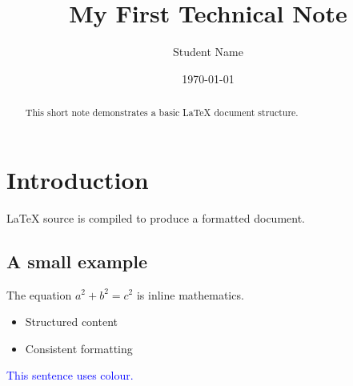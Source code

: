 \documentclass[12pt,a4paper]{article}
\title{My First Technical Note}
\author{Student Name}
\date{\today}
\begin{document}
\maketitle
\begin{abstract}
This short note demonstrates a basic LaTeX document structure.
\end{abstract}
\section{Introduction}
LaTeX source is compiled to produce a formatted document.
\subsection{A small example}
The equation \(a^2+b^2=c^2\) is inline mathematics.
\begin{itemize}
  \item Structured content
  \item Consistent formatting
\end{itemize}
\textcolor{blue}{This sentence uses colour.}
\end{document}
